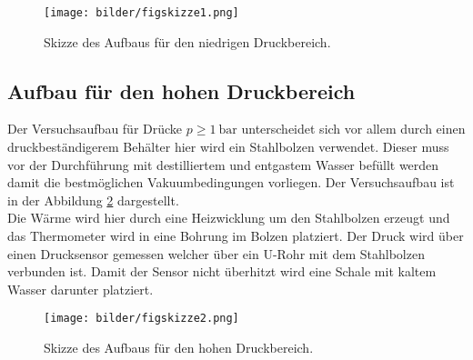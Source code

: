 \begin{figure}
    \centering
    \texttt{[image: bilder/figskizze1.png]}
    \caption{Skizze des Aufbaus für den niedrigen Druckbereich. \cite{skript}} 
    \label{fig:figskizze1}
\end{figure}

\subsection{Aufbau für den hohen Druckbereich} %
Der Versuchsaufbau für Drücke $p \geq \SI{1}{\bar}$ unterscheidet sich vor allem durch einen druckbeständigerem Behälter hier wird ein Stahlbolzen verwendet. Dieser muss vor der Durchführung mit destilliertem und entgastem Wasser befüllt werden
damit die bestmöglichen Vakuumbedingungen vorliegen. Der Versuchsaufbau ist in der Abbildung \ref{fig:figskizze2} dargestellt.
\newline
\\
Die Wärme wird hier durch eine Heizwicklung um den Stahlbolzen erzeugt und das Thermometer wird in eine Bohrung im
Bolzen platziert. Der Druck wird über einen Drucksensor gemessen welcher über ein U-Rohr mit dem Stahlbolzen verbunden ist. Damit der Sensor nicht überhitzt wird eine Schale mit kaltem Wasser darunter platziert.

\begin{figure}
    \centering
    \texttt{[image: bilder/figskizze2.png]}
    \caption{Skizze des Aufbaus für den hohen Druckbereich. \cite{skript}} 
    \label{fig:figskizze2}
\end{figure}

